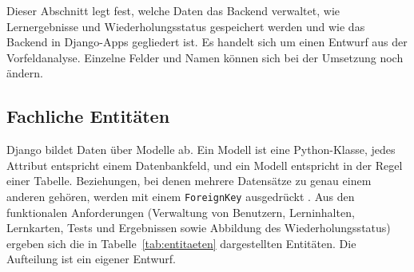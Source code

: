 Dieser Abschnitt legt fest, welche Daten das Backend verwaltet, wie Lernergebnisse und Wiederholungsstatus gespeichert werden und wie das Backend in Django-Apps gegliedert ist. Es handelt sich um einen Entwurf aus der Vorfeldanalyse. Einzelne Felder und Namen können sich bei der Umsetzung noch ändern.

\subsection{Fachliche Entitäten}
\label{subsec:entitaeten}
Django bildet Daten über Modelle ab. Ein Modell ist eine Python-Klasse, jedes Attribut entspricht einem Datenbankfeld, und ein Modell entspricht in der Regel einer Tabelle. Beziehungen, bei denen mehrere Datensätze zu genau einem anderen gehören, werden mit einem \texttt{ForeignKey} ausgedrückt \parencite{djangoModels}.
Aus den funktionalen Anforderungen (Verwaltung von Benutzern, Lerninhalten, Lernkarten, Tests und Ergebnissen sowie Abbildung des Wiederholungsstatus) ergeben sich die in Tabelle~\ref{tab:entitaeten} dargestellten Entitäten. Die Aufteilung ist ein eigener Entwurf.
\begingroup
\small
\setlength{\tabcolsep}{4pt}
